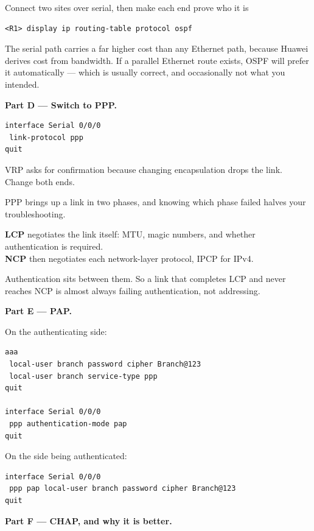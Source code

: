 \begin{labproject}{Connect two sites over serial, then make each end prove who it is}
\begin{lstlisting}[style=utpterminal]
<R1> display ip routing-table protocol ospf
\end{lstlisting}

The serial path carries a far higher cost than any Ethernet path, because Huawei derives cost from bandwidth. If a parallel Ethernet route exists, OSPF will prefer it automatically --- which is usually correct, and occasionally not what you intended.

\medskip\noindent\textbf{Part D --- Switch to PPP.}\par

\begin{lstlisting}[style=utpterminal]
interface Serial 0/0/0
 link-protocol ppp
quit
\end{lstlisting}

VRP asks for confirmation because changing encapsulation drops the link. Change both ends.

\begin{keyidea}
PPP brings up a link in two phases, and knowing which phase failed halves your troubleshooting.

\textbf{LCP} negotiates the link itself: MTU, magic numbers, and whether authentication is required.\\
\textbf{NCP} then negotiates each network-layer protocol, IPCP for IPv4.

Authentication sits between them. So a link that completes LCP and never reaches NCP is almost always failing authentication, not addressing.
\end{keyidea}

\medskip\noindent\textbf{Part E --- PAP.}\par
On the authenticating side:

\begin{lstlisting}[style=utpterminal]
aaa
 local-user branch password cipher Branch@123
 local-user branch service-type ppp
quit

interface Serial 0/0/0
 ppp authentication-mode pap
quit
\end{lstlisting}

On the side being authenticated:

\begin{lstlisting}[style=utpterminal]
interface Serial 0/0/0
 ppp pap local-user branch password cipher Branch@123
quit
\end{lstlisting}

\medskip\noindent\textbf{Part F --- CHAP, and why it is better.}\par


\end{labproject}
